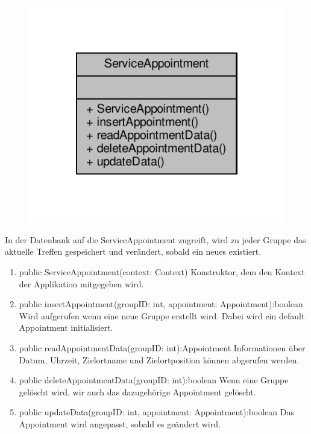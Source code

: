 \begin{figure}[H]
	\includegraphics[scale = 1]{res/umlClasses/service_appointment__coll__graph.pdf}
	\centering
\end{figure}
In der Datenbank auf die ServiceAppointment zugreift, wird zu jeder Gruppe das aktuelle Treffen gespeichert und verändert, sobald ein neues existiert.
\begin{enumerate}
	\item public ServiceAppointment(context: Context)
		Konstruktor, dem den Kontext der Applikation mitgegeben wird.
	\item public insertAppointment(groupID: int, appointment: Appointment):boolean
		Wird aufgerufen wenn eine neue Gruppe erstellt wird. Dabei wird ein default Appointment initialisiert.
	\item public readAppointmentData(groupID: int):Appointment 
		Informationen über Datum, Uhrzeit, Zielortname und Zielortposition können abgerufen werden.
	\item public deleteAppointmentData(groupID: int):boolean 
		Wenn eine Gruppe gelöscht wird, wir auch das dazugehörige Appointment gelöscht.
	\item public updateData(groupID: int, appointment: Appointment):boolean 
		Das Appointment wird angepasst, sobald es geändert wird.
\end{enumerate}

